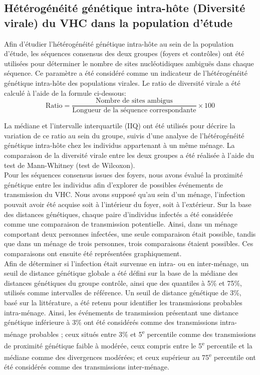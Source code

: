 \documentclass[a4paper,12pt]{article}
\begin{document}
\subsection [Hétérogénéité génétique intra-hôte du VHC ] {Hétérogénéité génétique intra-hôte (Diversité virale) du VHC dans la population d’étude}
\label{sub:DV}

Afin d’étudier l’hétérogénéité génétique intra-hôte au sein de la population d’étude, les séquences consensus des deux groupes (foyers et contrôles) ont été utilisées pour déterminer le nombre de sites nucléotidiques ambiguës dans chaque séquence. Ce paramètre a été considéré comme un indicateur de l’hétérogénéité génétique intra-hôte des populations virales. Le ratio de diversité virale a été calculé à l’aide de la formule ci-dessous:
\[
\text{Ratio} =
\frac{\text{Nombre de sites ambigus}}
{\text{Longueur de la séquence correspondante}}
\times 100
\]

La médiane et l’intervalle interquartile (IIQ) ont été utilisés pour décrire la variation de ce ratio au sein du groupe, suivis d’une analyse de l’hétérogénéité génétique intra-hôte chez les individus appartenant à un même ménage. La comparaison de la diversité virale entre les deux groupes a été réalisée à l’aide du test de Mann-Whitney (test de Wilcoxon).\\


Pour les séquences consensus issues des foyers, nous avons évalué la proximité génétique entre les individus afin d’explorer de possibles événements de transmission du VHC. Nous avons supposé qu’au sein d’un ménage, l’infection pouvait avoir été acquise soit à l’intérieur du foyer, soit à l’extérieur. Sur la base des distances génétiques, chaque paire d’individus infectés a été considérée comme une comparaison de transmission potentielle. Ainsi, dans un ménage comportant deux personnes infectées, une seule comparaison était possible, tandis que dans un ménage de trois personnes, trois comparaisons étaient possibles. Ces comparaisons ont ensuite été représentées graphiquement.\\


Afin de déterminer si l’infection était survenue en intra- ou en inter-ménage, un seuil de distance génétique globale a été défini sur la base de la médiane des distances génétiques du groupe contrôle, ainsi que des quantiles à 5\% et 75\%, utilisés comme intervalles de référence. Un seuil de distance génétique de 3\%, basé sur la littérature, a été retenu pour identifier les transmissions probables intra-ménage. Ainsi, les événements de transmission présentant une distance génétique inférieure à 3\% ont été considérés comme des transmissions intra-ménage probables ; ceux situés entre 3\% et 5\textsuperscript{e} percentile comme des transmissions de proximité génétique faible à modérée, ceux compris entre le 5\textsuperscript{e} percentile et la médiane comme des divergences modérées; et ceux supérieur au 75\textsuperscript{e} percentile ont été considérés comme des transmissions inter-ménage.
  
\end{document}

